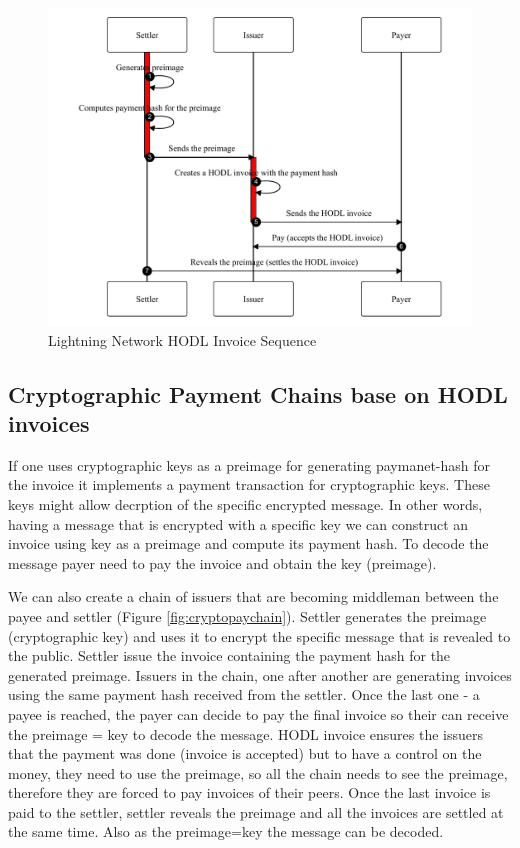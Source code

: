 \documentclass{article}
\begin{document}
\begin{figure}
	\centering
	\includegraphics[scale=0.6]{LNDSequence.pdf}
	\caption{Lightning Network HODL Invoice Sequence}
	\label{fig:fr:lndsequence}
\end{figure}

\subsection{Cryptographic Payment Chains base on HODL invoices}
If one uses cryptographic keys as a preimage for generating paymanet-hash for the invoice it implements a payment transaction for cryptographic keys. These keys might allow decrption of the specific encrypted message. In other words, having a message that is encrypted with a specific key we can construct an invoice using key as a preimage and compute its payment hash. To decode the message payer need to pay the invoice and obtain the key (preimage).

We can also create a chain of issuers that are becoming middleman between the payee and settler (Figure \ref{fig:cryptopaychain}). Settler generates the preimage (cryptographic key) and uses it to encrypt the specific message that is revealed to the public. Settler issue the invoice containing the payment hash for the generated preimage. Issuers in the chain, one after another are generating invoices using the same payment hash received from the settler. Once the last one - a payee is reached, the payer can decide to pay the final invoice so their can receive the preimage = key to decode the message. HODL invoice ensures the issuers that the payment was done (invoice is accepted) but to have a control on the money, they need to use the preimage, so all the chain needs to see the preimage, therefore they are forced to pay invoices of their peers. Once the last invoice is paid to the settler, settler reveals the preimage and all the invoices are settled at the same time. Also as the preimage=key the message can be decoded.
\end{document}
